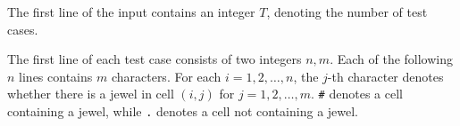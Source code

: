 The first line of the input contains an integer $T$, denoting the number of test cases.

The first line of each test case consists of two integers $n,m$.
Each of the following $n$ lines contains $m$ characters.
For each $i = 1,2,\ldots,n$, the $j$-th character denotes whether there is a jewel in cell $(i,j)$ for $j = 1,2,\ldots,m$. \texttt{\#} denotes a cell containing a jewel, while \texttt{.} denotes a cell not containing a jewel.
